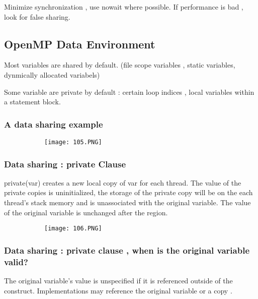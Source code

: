 \documentclass{article}
\begin{document}
Minimize synchronization , use nowait where possible. If performance is bad , look for false sharing.

\vspace{60mm}
\subsection{OpenMP Data Environment}

Most variables are shared by default. (file scope variables , static variables, dynmically allocated variabels)

Some variable are private by default : certain loop indices , local variables within a statement block.

\subsubsection{A data sharing example}

\begin{figure}[ht!]
  \centering
  \begin{subfigure}[b]{0.5\linewidth}
    \texttt{[image: 105.PNG]}
  \end{subfigure}
\end{figure}

\subsubsection{Data sharing : private Clause}

private(var) creates a new local copy of var for each thread. The value of the private copies is uninitialized, the storage of the private copy will be on the each thread's stack memory and is unassociated with the original variable. The value of the original variable is unchanged after the region.

\begin{figure}[ht!]
  \centering
  \begin{subfigure}[b]{0.5\linewidth}
    \texttt{[image: 106.PNG]}
  \end{subfigure}
\end{figure}

\subsubsection{Data sharing : private clause , when is the original variable valid?}

The original variable's value is unspecified if it is referenced outside of the construct. Implementations may reference the original variable or a copy .
\end{document}
